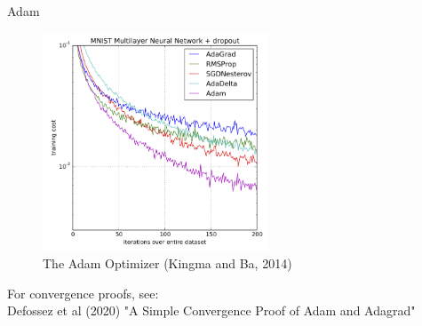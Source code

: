\documentclass[10pt]{beamer}
\begin{document}
\begin{frame}{Adam}

\begin{figure}[h]
\caption{The Adam Optimizer (Kingma and Ba, 2014)}
\centering
\includegraphics[width=0.6\textwidth]{figs/ADAM}
\end{figure}

For convergence proofs, see:\\
Defossez et al (2020) "A Simple Convergence Proof of Adam and Adagrad"

\end{frame}
\end{document}

